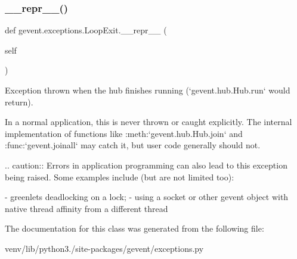 \subsubsection{\texorpdfstring{\+\_\+\+\_\+repr\+\_\+\+\_\+()}{\_\_repr\_\_()}}
{\footnotesize\ttfamily def gevent.\+exceptions.\+Loop\+Exit.\+\_\+\+\_\+repr\+\_\+\+\_\+ (\begin{DoxyParamCaption}\item[{}]{self }\end{DoxyParamCaption})}

\begin{DoxyVerb}Exception thrown when the hub finishes running (`gevent.hub.Hub.run`
would return).

In a normal application, this is never thrown or caught
explicitly. The internal implementation of functions like
:meth:`gevent.hub.Hub.join` and :func:`gevent.joinall` may catch it, but user code
generally should not.

.. caution::
   Errors in application programming can also lead to this exception being
   raised. Some examples include (but are not limited too):

   - greenlets deadlocking on a lock;
   - using a socket or other gevent object with native thread
 affinity from a different thread\end{DoxyVerb}
 

The documentation for this class was generated from the following file\+:\begin{DoxyCompactItemize}
\item 
venv/lib/python3./site-\/packages/gevent/exceptions.\+py\end{DoxyCompactItemize}
